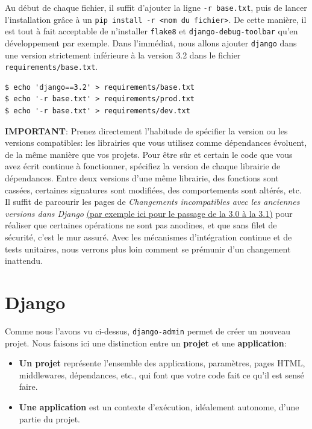 \documentclass[11pt]{amsbook}
\newcommand{\admonition}[2]{\textbf{#1}: {#2}}
\begin{document}
Au début de chaque fichier, il suffit d’ajouter la ligne \texttt{-r base.txt}, puis de lancer l’installation grâce à un \texttt{pip install -r <nom du fichier>}.
De cette manière, il est tout à fait acceptable de n’installer \texttt{flake8} et \texttt{django-debug-toolbar} qu’en développement par exemple.
Dans l’immédiat, nous allons ajouter \texttt{django} dans une version strictement inférieure à la version 3.2 dans le fichier \texttt{requirements/base.txt}.


\begin{verbatim}
$ echo 'django==3.2' > requirements/base.txt
$ echo '-r base.txt' > requirements/prod.txt
$ echo '-r base.txt' > requirements/dev.txt
\end{verbatim}

\admonition{IMPORTANT}{Prenez directement l’habitude de spécifier la version ou les versions compatibles: les librairies que vous utilisez comme dépendances évoluent, de la même manière que vos projets.
Pour être sûr et certain le code que vous avez écrit continue à fonctionner, spécifiez la version de chaque librairie de dépendances.
Entre deux versions d’une même librairie, des fonctions sont cassées, certaines signatures sont modifiées, des comportements sont altérés, etc. Il suffit de parcourir les pages de \emph{Changements incompatibles avec les anciennes versions dans Django} \href{https://docs.djangoproject.com/fr/3.1/releases/3.0/}{(par exemple ici pour le passage de la 3.0 à la 3.1)} pour réaliser que certaines opérations ne sont pas anodines, et que sans filet de sécurité, c’est le mur assuré.
Avec les mécanismes d’intégration continue et de tests unitaires, nous verrons plus loin comment se prémunir d’un changement inattendu.}
\hypertarget{x-django}{\section{Django}}
Comme nous l’avons vu ci-dessus, \texttt{django-admin} permet de créer un nouveau projet.
Nous faisons ici une distinction entre un \textbf{projet} et une \textbf{application}:


\begin{itemize}

\item \textbf{Un projet} représente l’ensemble des applications, paramètres, pages HTML, middlewares, dépendances, etc., qui font que votre code fait ce qu’il est sensé faire.

\item \textbf{Une application} est un contexte d’exécution, idéalement autonome, d’une partie du projet.

\end{itemize}
\end{document}
